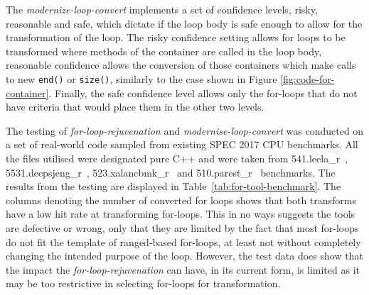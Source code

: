 \documentclass[bsc,frontabs,singlespacing,twoside,parskip,deptreport]{infthesis}
\begin{document}
The \textit{modernize-loop-convert} implements a set of confidence levels, risky, reasonable and safe, which dictate if the loop body is safe enough to allow for the transformation of the loop. The risky confidence setting allows for loops to be transformed where methods of the container are called in the loop body, reasonable confidence allows the conversion of those containers which make calls to new \texttt{end()} or \texttt{size()}, similarly to the case shown in Figure \ref{fig:code-for-container}. Finally, the safe confidence level allows only the for-loops that do not have criteria that would place them in the other two levels.

The testing of \textit{for-loop-rejuvenation} and \textit{modernise-loop-convert} was conducted on a set of real-world code sampled from existing SPEC 2017 CPU benchmarks. All the files utilised were designated pure C++ and were taken from 541.leela\_r~\cite{SPEC_LEELA}, 5531.deepsjeng\_r~\cite{SPEC_DEEPSJENG}, 523.xalancbmk\_r~\cite{SPEC_XALANCBMK} and 510.parest\_r~\cite{SPEC_PAREST} benchmarks. The results from the testing are displayed in Table~\ref{tab:for-tool-benchmark}. The columns denoting the number of converted for loops shows that both transforms have a low hit rate at transforming for-loops. This in no ways suggests the tools are defective or wrong, only that they are limited by the fact that most for-loops do not fit the template of ranged-based for-loops, at least not without completely changing the intended purpose of the loop. However, the test data does show that the impact the \textit{for-loop-rejuvenation} can have, in its current form, is limited as it may be too restrictive in selecting for-loops for transformation.
\end{document}
